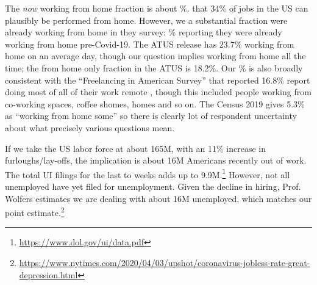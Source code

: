 \documentclass[12pt]{article}
\begin{document}
The \emph{now} working from home fraction is about \WFH{}\%.
\cite{dingel2020} that 34\% of jobs in the US can plausibly be performed from home. 
However, we a substantial fraction were already working from home in they survey: \alreadyWFH{}\% reporting they were already working from home pre-Covid-19.
The ATUS release has 23.7\% working from home on an average day, though our question implies working from home all the time; the from home only fraction in the ATUS is 18.2\%. 
Our \WFH{}\% is also broadly consistent with the ``Freelancing in American Survey'' that reported 16.8\% report doing most of all of their work remote \citep{upwork2019}, though this included people working from co-working spaces, coffee shomes, homes and so on.
The Census 2019 gives 5.3\% as ``working from home some'' so there is clearly lot of respondent uncertainty about what precisely various questions mean. 





If we take the US labor force at about 165M, with an 11\% increase in furloughs/lay-offs, the implication is about 16M Americans recently out of work.
The total UI filings for the last to weeks adds up to 9.9M.\footnote{
  \url{https://www.dol.gov/ui/data.pdf}
}
However, not all unemployed have yet filed for unemployment.
Given the decline in hiring, Prof. Wolfers estimates we are dealing with about 16M unemployed, which matches our point estimate.\footnote{
  \url{https://www.nytimes.com/2020/04/03/upshot/coronavirus-jobless-rate-great-depression.html}
}

\end{document}
